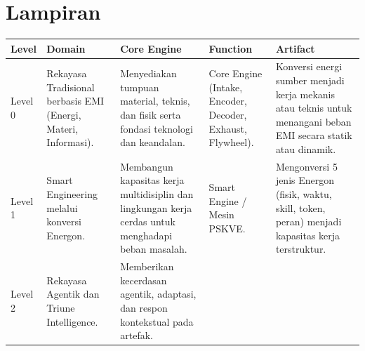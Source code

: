 \documentclass[
  letterpaper,
  DIV=11,
  numbers=noendperiod]{scrreprt}
\newcounter{none} %
\begin{document}

\chapter*{Lampiran}\label{lampiran}


{\def\LTcaptype{none} %
\begin{longtable}[]{@{}
  >{\raggedright\arraybackslash}p{}
  >{\raggedright\arraybackslash}p{}
  >{\raggedright\arraybackslash}p{}
  >{\raggedright\arraybackslash}p{}
  >{\raggedright\arraybackslash}p{}@{}}
\toprule\noalign{}
\begin{minipage}[b]{\linewidth}\raggedright
Level
\end{minipage} & \begin{minipage}[b]{\linewidth}\raggedright
Domain
\end{minipage} & \begin{minipage}[b]{\linewidth}\raggedright
Core Engine
\end{minipage} & \begin{minipage}[b]{\linewidth}\raggedright
Function
\end{minipage} & \begin{minipage}[b]{\linewidth}\raggedright
Artifact
\end{minipage} \\
\midrule\noalign{}
\endhead
\bottomrule\noalign{}
\endlastfoot
Level 0 & Rekayasa Tradisional berbasis EMI (Energi, Materi, Informasi).
& Menyediakan tumpuan material, teknis, dan fisik serta fondasi
teknologi dan keandalan. & Core Engine (Intake, Encoder, Decoder,
Exhaust, Flywheel). & Konversi energi sumber menjadi kerja mekanis atau
teknis untuk menangani beban EMI secara statik atau dinamik. \\
Level 1 & Smart Engineering melalui konversi Energon. & Membangun
kapasitas kerja multidisiplin dan lingkungan kerja cerdas untuk
menghadapi beban masalah. & Smart Engine / Mesin PSKVE. & Mengonversi 5
jenis Energon (fisik, waktu, skill, token, peran) menjadi kapasitas
kerja terstruktur. \\
Level 2 & Rekayasa Agentik dan Triune Intelligence. & Memberikan
kecerdasan agentik, adaptasi, dan respon kontekstual pada artefak. &

\end{longtable}}
\end{document}
